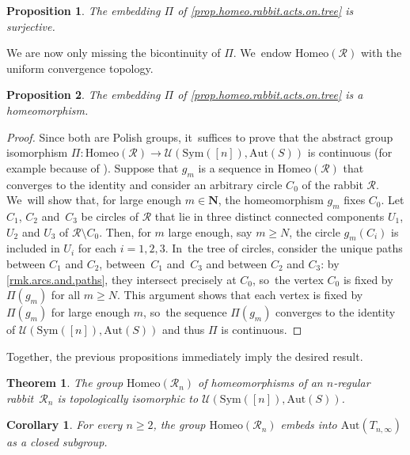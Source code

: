 \documentclass[10pt,a4paper]{amsart}
\newtheorem{theorem}{Theorem}[section]
\newtheorem{proposition}[proposition]{Proposition}
\newtheorem{corollary}[corollary]{Corollary}
\theoremstyle{definition}
\newcommand{\Aut}{\mathrm{Aut}}
\newcommand{\Sym}{\mathrm{Sym}}
\newcommand{\Homeo}{\mathrm{Homeo}}
\newcommand{\R}{\mathcal{R}}
\newcommand{\U}{\mathcal{U}}
\begin{document}
\begin{proposition}
\label{prop.rabbit.embedding.is.surjective}
The embedding $\Pi$ of \cref{prop.homeo.rabbit.acts.on.tree} is surjective.
\end{proposition}

We are now only missing the bicontinuity of $\Pi$. We~endow $\Homeo(\R)$ with the uniform convergence topology.

\begin{proposition}
\label{prop.rabbit.embedding.is.continuous}
The embedding $\Pi$ of \cref{prop.homeo.rabbit.acts.on.tree} is a homeomorphism.
\end{proposition}

\begin{proof}
Since both are Polish groups, it~suffices to prove that the abstract group isomorphism $\Pi \colon \Homeo(\R) \to \U(\Sym([n]),\Aut(S))$ is continuous (for example because of \cite[Cor.\,2.3.4]{MR2455198}).
Suppose that $g_m$ is a sequence in $\Homeo(\R)$ that converges to the identity and consider an arbitrary circle $C_0$ of the rabbit $\R$. We~will show that, for large enough $m \in \mathbf{N}$, the homeomorphism $g_m$ fixes $C_0$.
Let $C_1$, $C_2$ and~$C_3$ be circles of $\R$ that lie in three distinct connected components $U_1$, $U_2$ and $U_3$ of $\R \setminus C_0$.
Then, for $m$ large enough, say $m \geq N$, the circle $g_m (C_i)$ is included in $U_i$ for each $i = 1, 2, 3$. In~the tree of circles, consider the unique paths between $C_1$ and $C_2$, between~$C_1$ and~$C_3$ and between $C_2$ and $C_3$:
by \cref{rmk.arcs.and.paths}, they intersect precisely at $C_0$, so~the vertex $C_0$ is fixed by $\Pi(g_m)$ for all $m \geq N$.
This argument shows that each vertex is fixed by $\Pi(g_m)$ for large enough $m$, so~the sequence $\Pi(g_m)$ converges to the identity of $\U(\Sym([n]),\Aut(S))$ and thus $\Pi$ is continuous.
\end{proof}

Together, the previous propositions immediately imply the desired result.


\begin{theorem}
\label{thm.homeo.rabbits.are.auto.trees}
The group $\Homeo(\R_n)$ of homeomorphisms of an $n$-regular rabbit~$\R_n$ is topologically isomorphic to $\U (\Sym([n]),\Aut(S))$.
\end{theorem}

\setcounter{theorem}{30}
\begin{corollary}
\label{cor.rabbit.groups.closed}
For every $n \geq 2$, the group $\Homeo(\R_n)$ embeds into $\Aut(T_{n,\infty})$ as a closed subgroup.
\end{corollary}
\end{document}
